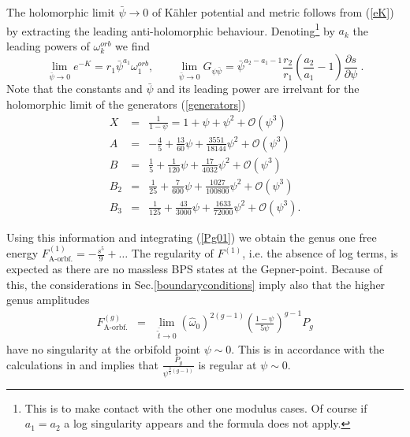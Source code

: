 \documentclass[12pt]{article}
\begin{document}
The holomorphic limit  $\bar{\psi}\rightarrow 0$  of K\"ahler
potential and metric follows from (\ref{eK}) by extracting the
leading anti-holomorphic behaviour. Denoting\footnote{This  is to
make contact with the other one modulus cases. Of course if
$a_1=a_2$ a log singularity appears and the formula does not
apply.} by $a_k$ the leading powers of  $\omega_k^{orb}$  we find
\begin{equation}
\lim_{\bar \psi\rightarrow 0} e^{-K}=r_1 \bar \psi^{a_1}
\omega^{orb}_1, \qquad \lim_{\bar \psi\rightarrow 0} G_{\psi\bar
\psi}= \bar \psi^{a_2-a_1-1}
\frac{r_2}{r_1}\left(\frac{a_2}{a_1}-1\right) \frac{\partial
s}{\partial \psi} \ .
\end{equation}
Note that the constants and  $\bar \psi$ and its leading power
are irrelvant for the holomorphic limit of the generators
(\ref{generators})
\begin{eqnarray}
X&=& \frac{1}{1-\psi}=1+\psi+\psi^{2}+\mathcal{O}(\psi^{3})
\nonumber \\ A&=& -\frac{4}{5}+\frac{13}{60}\psi+
\frac{3551}{18144}\psi^2+\mathcal{O}(\psi^{3}) \nonumber \\
B&=&
\frac{1}{5}+\frac{1}{120}\psi+\frac{17}{4032}\psi^2+\mathcal{O}(\psi^{3})
\nonumber \\
B_2 &=& \frac{1}{25}+\frac{7}{600}\psi+\frac{1027}{100800}\psi^2
+\mathcal{O}(\psi^{3}) \nonumber
\\
B_3 &=&
\frac{1}{125}+\frac{43}{3000}\psi+\frac{1633}{72000}\psi^2+\mathcal{O}(\psi^{3}).
\nonumber
\end{eqnarray}

Using this information and integrating (\ref{Pg01}) we obtain the
genus one free energy $F^{(1)}_{\textrm{A-orbf.}}=
-\frac{s^5}{9}+\ldots$ The regularity of $F^{(1)}$, i.e. the
absence of log terms, is expected as there are no massless BPS
states at the Gepner-point. Because of this, the considerations in
Sec.\ref{boundaryconditions} imply also that the higher genus
amplitudes
\begin{eqnarray} \label{fgorb}
F^{(g)}_{\textrm{A-orbf.}} &=& \lim_{\bar{\tilde t}\rightarrow 0}
(\hat \omega_0)^{2(g-1)}(\frac{1-\psi}{5\psi})^{g-1}P_g
\end{eqnarray}
have no singularity at the orbifold point $\psi\sim 0$. This is in
accordance with the calculations in \cite{Katz:1999} and implies
that $\frac{P_g}{\psi^{\frac{3}{5}(g-1)}}$ is regular at $\psi\sim
0$.
\end{document}
